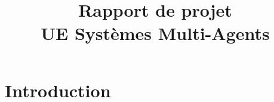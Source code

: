 \documentclass[a4paper]{article}
\begin{document}
	


	\title{Rapport de projet\\UE Systèmes Multi-Agents}

	  \begin{titlepage}
	    \def\titletype{Systèmes Multi-Agent}
	    \def\majortitle{Rapport Projet ... : ... Coordination de drône ... ?}
	    \def\docversion{1.0}
	    
	  \end{titlepage}

    \newpage
    \tableofcontents
    \newpage


    \section{Introduction}
        
		\paragraph{}
		
		
        
    
    \newpage


    \section{}
        
\end{document}
